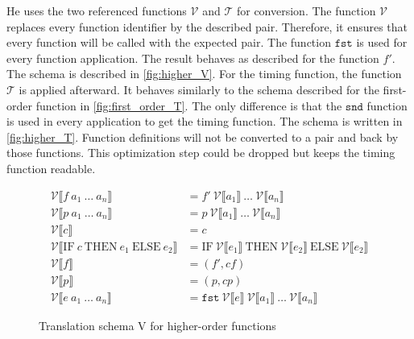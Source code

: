 He uses the two referenced functions $\mathcal{V}$ and $\mathcal{T}$ for conversion.
The function $\mathcal{V}$ replaces every function identifier by the described pair.
Therefore, it ensures that every function will be called with the expected pair.
The function $\texttt{fst}$ is used for every function application.
The result behaves as described for the function $f'$.
The schema is described in \autoref{fig:higher_V}.
For the timing function, the function $\mathcal{T}$ is applied afterward.
It behaves similarly to the schema described for the first-order function in \autoref{fig:first_order_T}.
The only difference is that the $\texttt{snd}$ function is used in every application to get the timing function.
The schema is written in \autoref{fig:higher_T}.
Function definitions will not be converted to a pair and back by those functions.
This optimization step could be dropped but keeps the timing function readable.
\begin{figure}
  \begin{align*}
    \mathcal{V}\llbracket f\ a_{1}\ \dots\ a_{n}\rrbracket &= f'\ \mathcal{V}\llbracket a_{1}\rrbracket\ \dots \ \mathcal{V}\llbracket a_{n}\rrbracket\\
    \mathcal{V}\llbracket p\ a_{1}\ \dots\ a_{n}\rrbracket &= p\ \mathcal{V}\llbracket a_{1}\rrbracket\ \dots \ \mathcal{V}\llbracket a_{n}\rrbracket\\
    \mathcal{V}\llbracket c \rrbracket &= c\\
    \mathcal{V}\llbracket \text{IF}\ c\ \text{THEN}\ e_{1}\ \text{ELSE}\ e_{2}\rrbracket &= \text{IF}\  \mathcal{V}\llbracket e_{1}\rrbracket\ \text{THEN}\ \mathcal{V}\llbracket e_{2}\rrbracket\ \text{ELSE}\ \mathcal{V}\llbracket e_{2}\rrbracket\\
    \mathcal{V}\llbracket f\rrbracket &= (f',cf)\\
    \mathcal{V}\llbracket p\rrbracket &= (p,cp)\\
    \mathcal{V}\llbracket e\ a_{1}\ \dots\ a_{n}\rrbracket &= \texttt{fst}\ \mathcal{V}\llbracket e\rrbracket\ \mathcal{V}\llbracket a_{1} \rrbracket\ \dots\ \mathcal{V}\llbracket a_{n}\rrbracket
  \end{align*}
  \caption{Translation schema V for higher-order functions}
  \label{fig:higher_V}
\end{figure}
